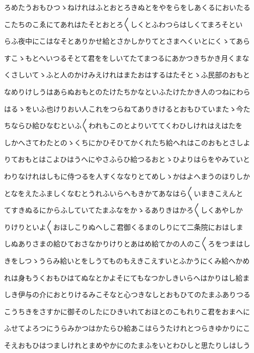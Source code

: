 \documentclass[a4paper,11pt,landscape]{ltjtarticle}
\begin{document}
\par\medskip
ろめたうおもひつゝねけれはふとおとろきぬとをやをらをしあくるにおいたる
\par\medskip
こたちのこゑにてあれはたそとおとろ〱しくとふわつらはしくてまろそとい
\par\medskip
らふ夜中にこはなそとありかせ給とさかしかりてとさまへくいとにくゝてあら
\par\medskip
すこゝもとへいつるそとて君ををしいてたてまつるにあかつきちかき月くまな
\par\medskip
くさしいてゝふと人のかけみえけれはまたおはするはたそとゝふ民部のおもと
\par\medskip
なめりけしうはあらぬおもとのたけたちかなといふたけたかき人のつねにわら
\par\medskip
はるゝをいふ也けりおい人これをつらねてありきけるとおもひていまたゝ今た
\par\medskip
ちならひ給ひなむといふ〱われもこのとよりいててくわひしけれはえはたを
\par\medskip
しかへさてわたとのゝくちにかひそひてかくれたち給へれはこのおもとさしよ
\par\medskip
りておもとはこよひはうへにやさふらひ給つるおとゝひよりはらをやみていと
\par\medskip
わりなけれはしもに侍つるを人すくななりとてめしゝかはよへまうのほりしか
\par\medskip
となをえたふましくなむとうれふいらへもきかてあなはら〱いまきこえんと
\par\medskip
てすきぬるにからふしていてたまふなをかゝるありきはかろ〱しくあやしか
\par\medskip
りけりといよ〱おほしこりぬへしこ君御くるまのしりにて二条院におはしま
\par\medskip
しぬありさまの給ひておさなかりけりとあはめ給てかの人のこ〱ろをつまはし
\par\medskip
きをしつゝうらみ給いとをしうてものもえきこえすいとふかうにくみ給へかめ
\par\medskip
れは身もうくおもひはてぬなとかよそにてもなつかしきいらへはかりはし給ま
\par\medskip
しき伊与の介におとりけるみこそなと心つきなしとおもひてのたまふありつる
\par\medskip
こうちきをさすかに御そのしたにひきいれておほとのこもれりこ君をおまへに
\par\medskip
ふせてよろつにうらみかつはかたらひ給あこはらうたけれとつらきゆかりにこ
\par\medskip
そえおもひはつましけれとまめやかにのたまふをいとわひしと思たりしはしう
\par\medskip
\end{document}
